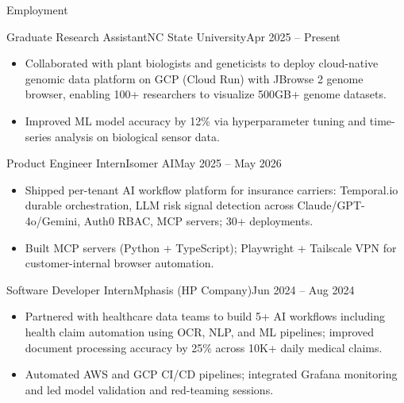 \documentclass[]{mcdowellcv}
\begin{document}
\makeheader

\begin{cvsection}{Employment}
  \begin{cvsubsection}{Graduate Research Assistant}{NC State University}{Apr 2025 -- Present}
    \begin{itemize}
      \item Collaborated with plant biologists and geneticists to deploy cloud-native genomic data platform on GCP (Cloud Run) with JBrowse 2 genome browser, enabling 100+ researchers to visualize 500GB+ genome datasets.
      \item Improved ML model accuracy by 12\% via hyperparameter tuning and time-series analysis on biological sensor data.
    \end{itemize}
    \vspace{-1.5pt}
  \end{cvsubsection}

  \begin{cvsubsection}{Product Engineer Intern}{Isomer AI}{May 2025 -- May 2026}
    \begin{itemize}
      \item Shipped per-tenant AI workflow platform for insurance carriers: Temporal.io durable orchestration, LLM risk signal detection across Claude/GPT-4o/Gemini, Auth0 RBAC, MCP servers; 30+ deployments.
      \item Built MCP servers (Python + TypeScript); Playwright + Tailscale VPN for customer-internal browser automation.
    \end{itemize}
    \vspace{-1.5pt}
  \end{cvsubsection}

  \begin{cvsubsection}{Software Developer Intern}{Mphasis (HP Company)}{Jun 2024 -- Aug 2024}
    \begin{itemize}
      \item Partnered with healthcare data teams to build 5+ AI workflows including health claim automation using OCR, NLP, and ML pipelines; improved document processing accuracy by 25\% across 10K+ daily medical claims.
      \item Automated AWS and GCP CI/CD pipelines; integrated Grafana monitoring and led model validation and red-teaming sessions.
    \end{itemize}
    \vspace{-1.5pt}
  \end{cvsubsection}


\end{cvsection}
\end{document}
